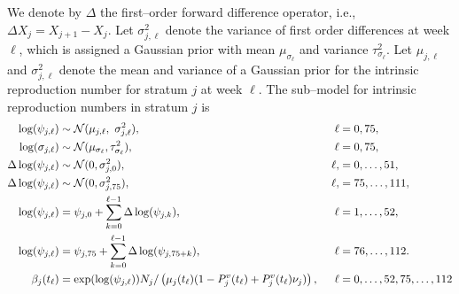 We denote by $ \Delta $ the first--order forward difference operator, i.e., $ \Delta X_j = X_{j+1} - X_j $. Let $ \sigma^2_{j,\ell} $ denote the variance of first order differences at week $ \ell $, which is assigned a Gaussian prior with mean $ \mu_{\sigma_\ell} $ and variance $ \tau^2_{\sigma_\ell} $. Let $ \mu_{j,\ell}$ and $ \sigma^2_{j,\ell} $ denote the mean and variance of a Gaussian prior for the intrinsic reproduction number for stratum $ j $ at week $ \ell $. The sub--model for intrinsic reproduction numbers in stratum $ j $ is
\begin{align}
\log(\psi_{j,\ell}) &\sim \mcN(\mu_{j,\ell},\ \sigma_{j,\ell}^2),&\ \ell&= 0,75, \nonumber\\
\log(\sigma_{j,\ell}) &\sim \mcN(\mu_{\sigma_\ell}, \tau_{\sigma_\ell}^2),&\ \ell&=0,75, \nonumber\\
\Delta\log(\psi_{j,\ell})&\sim \mcN(0, \sigma^2_{j,0}),&\ \ell,&=0,\dots,51, \nonumber\\
\Delta\log(\psi_{j,\ell})&\sim \mcN(0, \sigma^2_{j,75}),&\ \ell,&=75,\dots,111, \nonumber\\
\log(\psi_{j,\ell}) &= \psi_{j,0} + \sum_{k=0}^{\ell-1}\Delta\log(\psi_{j,k}),&\ \ell &= 1,\dots,52, \nonumber\\
\log(\psi_{j,\ell}) &= \psi_{j,75} + \sum_{k=0}^{\ell-1}\Delta\log(\psi_{j,75+k}),&\ \ell &= 76,\dots,112. \nonumber \\
\beta_j(t_\ell) &= \exp(\log(\psi_{j,\ell}))N_j/\left (\mu_{j}(t_\ell)(1 - P^v_j(t_\ell) + P_j^v(t_\ell)\nu_j)\right ),&\ \ell&=0,\dots,52,75,\dots,112 \nonumber
\end{align}

